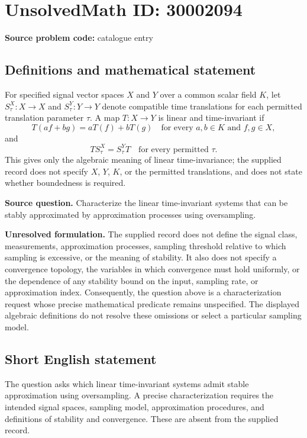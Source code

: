 \documentclass[11pt]{article}
\begin{document}
\section*{UnsolvedMath ID: 30002094}
\textbf{Source problem code:} catalogue entry
\subsection{Definitions and mathematical statement}
For specified signal vector spaces \(X\) and \(Y\) over a common scalar field \(K\), let \(S_\tau^X:X\to X\) and \(S_\tau^Y:Y\to Y\) denote compatible time translations for each permitted translation parameter \(\tau\). A map \(T:X\to Y\) is linear and time-invariant if
\[
T(af+bg)=aT(f)+bT(g)
\quad\text{for every }a,b\in K\text{ and }f,g\in X,
\]
and
\[
T S_\tau^X=S_\tau^Y T
\quad\text{for every permitted }\tau.
\]
This gives only the algebraic meaning of linear time-invariance; the supplied record does not specify \(X\), \(Y\), \(K\), or the permitted translations, and does not state whether boundedness is required.

\textbf{Source question.} Characterize the linear time-invariant systems that can be stably approximated by approximation processes using oversampling.

\textbf{Unresolved formulation.} The supplied record does not define the signal class, measurements, approximation processes, sampling threshold relative to which sampling is excessive, or the meaning of stability. It also does not specify a convergence topology, the variables in which convergence must hold uniformly, or the dependence of any stability bound on the input, sampling rate, or approximation index. Consequently, the question above is a characterization request whose precise mathematical predicate remains unspecified. The displayed algebraic definitions do not resolve these omissions or select a particular sampling model.
\subsection{Short English statement}
The question asks which linear time-invariant systems admit stable approximation using oversampling. A precise characterization requires the intended signal spaces, sampling model, approximation procedures, and definitions of stability and convergence. These are absent from the supplied record.
\end{document}
